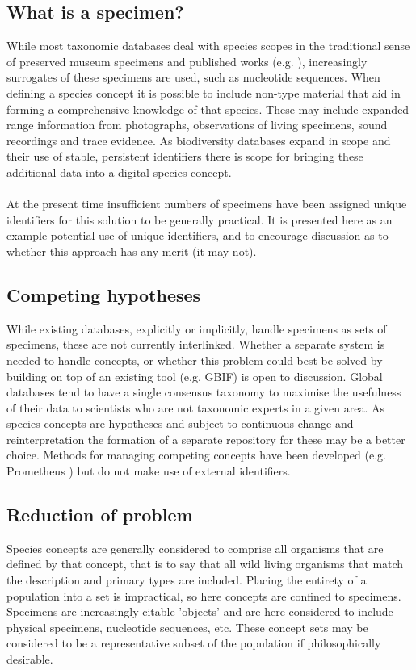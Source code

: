 \documentclass{article}
\begin{document}
   \subsection{What is a specimen?}
   While most taxonomic databases deal with species scopes in the traditional sense of preserved museum specimens and published works (e.g. \cite{pullan2000}), increasingly surrogates of these specimens are used, such as nucleotide sequences. When defining a species concept it is possible to include non-type material that aid in forming a comprehensive knowledge of that species. These may include expanded range information from photographs, observations of living specimens, sound recordings and trace evidence. As biodiversity databases expand in scope and their use of stable, persistent identifiers there is scope for bringing these additional data into a digital species concept. 
   \paragraph{}
   At the present time insufficient numbers of specimens have been assigned unique identifiers for this solution to be generally practical. It is presented here as an example potential use of unique identifiers, and to encourage discussion as to whether this approach has any merit (it may not).
   \subsection{Competing hypotheses}
   While existing databases, explicitly or implicitly, handle specimens as sets of specimens, these are not currently interlinked. Whether a separate system is needed to handle concepts, or whether this problem could best be solved by building on top of an existing tool (e.g. GBIF) is open to discussion. Global databases tend to have a single consensus taxonomy to maximise the usefulness of their data to scientists who are not taxonomic experts in a given area. As species concepts are hypotheses and subject to continuous change and reinterpretation the formation of a separate repository for these may be a better choice. Methods for managing competing concepts have been developed (e.g. Prometheus \cite{pullan2000}) but do not make use of external identifiers.

   \subsection{Reduction of problem}
   Species concepts are generally considered to comprise all organisms that are defined by that concept, that is to say that all wild living organisms that match the description and primary types are included. Placing the entirety of a population into a set is impractical, so here concepts are confined to specimens. Specimens are increasingly citable 'objects' and are here considered to include physical specimens, nucleotide sequences, etc. These concept sets may be considered to be a representative subset of the population if philosophically desirable.
\end{document}
